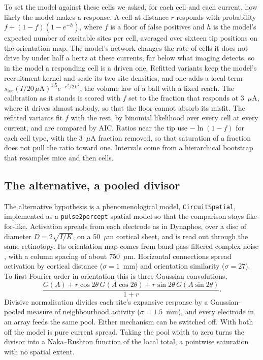 \documentclass[10pt,twocolumn]{article}
\newcommand{\pptwo}{\texttt{pulse2percept}}
\newcommand{\um}{\ensuremath{\mu\text{m}}}
\newcommand{\uA}{\ensuremath{\mu\text{A}}}
\begin{document}
To set the model against these cells we asked, for each cell and each
current, how likely the model makes a response. A cell at distance $r$
responds with probability $f + (1-f)(1-e^{-h})$, where $f$ is a floor of
false positives and $h$ is the model's expected number of
excitable sites per cell, averaged over sixteen tip positions on the
orientation map. The model's network changes the rate of cells it does
not drive by under half a hertz at these currents, far below what imaging
detects, so in the model a responding cell is a driven one. Refitted
variants keep the model's recruitment kernel and scale its two site
densities, and one adds a local term
$s_\mathrm{loc}(I/20\,\mu\mathrm{A})^{1.5}e^{-r^2/2L^2}$, the volume law
of a ball with a fixed reach. The calibration as it stands is scored with
$f$ set to the fraction that responds at 3~\uA, where it drives almost
nobody, so that the floor cannot absorb its misfit. The refitted variants
fit $f$ with the rest, by binomial likelihood over every cell at every
current, and are compared by AIC. Ratios near the tip use
$-\ln(1-f)$ for each cell type, with the 3~\uA{} fraction removed, so that
saturation of a fraction does not pull the ratio toward one. Intervals come
from a hierarchical bootstrap that resamples mice and then cells.

\subsection{The alternative, a pooled divisor}
\label{sec:pooledmethods}

The alternative hypothesis is a phenomenological model,
\texttt{CircuitSpatial}, implemented as a \pptwo{} spatial model so that
the comparison stays like-for-like. Activation spreads from each electrode
as in Dynaphos, over a disc of diameter $D = 2\sqrt{I/K}$, on a 50~\um{}
cortical sheet, and is read out through the same retinotopy. Its
orientation map comes from band-pass filtered complex noise
\citep{rojer1990}, with a column spacing of about 750~\um. Horizontal
connections spread activation by cortical distance ($\sigma = 1$~mm) and
orientation similarity ($\sigma = 27$\textdegree). To first Fourier order
in orientation this is three Gaussian convolutions,
\begin{equation}
  \frac{G(A) + r\cos2\theta\, G(A\cos2\theta) + r\sin2\theta\, G(A\sin2\theta)}
       {1+r}.
\end{equation}
Divisive normalisation \citep{carandini2012} divides each site's expansive
response by a Gaussian-pooled measure of neighbourhood activity
($\sigma = 1.5$~mm), and every electrode in an array feeds the same pool.
Either mechanism can be switched off. With both off the model is pure
current spread. Taking the pool width to zero turns the divisor into a
Naka--Rushton function of the local total, a pointwise saturation with no
spatial extent.
\end{document}
